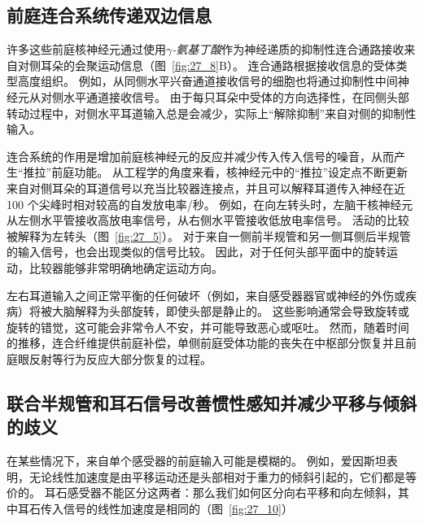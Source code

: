 \subsection{前庭连合系统传递双边信息}

许多这些前庭核神经元通过使用\textit{$\gamma$-氨基丁酸}作为神经递质的抑制性连合通路接收来自对侧耳朵的会聚运动信息（图~\ref{fig:27_8}B）。
连合通路根据接收信息的受体类型高度组织。
例如，从同侧水平兴奋通道接收信号的细胞也将通过抑制性中间神经元从对侧水平通道接收信号。
由于每只耳朵中受体的方向选择性，在同侧头部转动过程中，对侧水平耳道输入总是会减少，实际上“解除抑制”来自对侧的抑制性输入。


连合系统的作用是增加前庭核神经元的反应并减少传入传入信号的噪音，从而产生“推拉”前庭功能。
从工程学的角度来看，核神经元中的“推拉”设定点不断更新来自对侧耳朵的耳道信号以充当比较器连接点，并且可以解释耳道传入神经在近 100 个尖峰时相对较高的自发放电率/秒。
例如，在向左转头时，左脑干核神经元从左侧水平管接收高放电率信号，从右侧水平管接收低放电率信号。
活动的比较被解释为左转头（图~\ref{fig:27_5}）。
对于来自一侧前半规管和另一侧耳侧后半规管的输入信号，也会出现类似的信号比较。
因此，对于任何头部平面中的旋转运动，比较器能够非常明确地确定运动方向。


左右耳道输入之间正常平衡的任何破坏（例如，来自感受器器官或神经的外伤或疾病）将被大脑解释为头部旋转，即使头部是静止的。
这些影响通常会导致旋转或旋转的错觉，这可能会非常令人不安，并可能导致恶心或呕吐。
然而，随着时间的推移，连合纤维提供前庭补偿，单侧前庭受体功能的丧失在中枢部分恢复并且前庭眼反射等行为反应大部分恢复的过程。



\subsection{联合半规管和耳石信号改善惯性感知并减少平移与倾斜的歧义}

在某些情况下，来自单个感受器的前庭输入可能是模糊的。
例如，爱因斯坦\cite{einstein1908relativitatsprinzip}表明，无论线性加速度是由平移运动还是头部相对于重力的倾斜引起的，它们都是等价的。
耳石感受器不能区分这两者：那么我们如何区分向右平移和向左倾斜，其中耳石传入信号的线性加速度是相同的（图~\ref{fig:27_10}）



